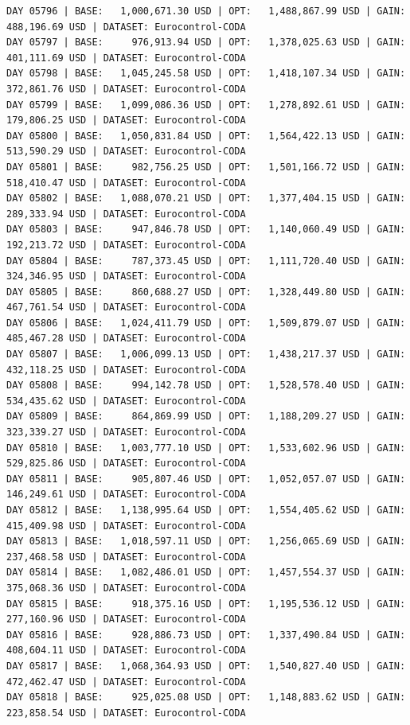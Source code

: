 \documentclass[11pt,a4paper]{article}
\begin{document}
\begin{verbatim}
DAY 05796 | BASE:   1,000,671.30 USD | OPT:   1,488,867.99 USD | GAIN: 488,196.69 USD | DATASET: Eurocontrol-CODA
DAY 05797 | BASE:     976,913.94 USD | OPT:   1,378,025.63 USD | GAIN: 401,111.69 USD | DATASET: Eurocontrol-CODA
DAY 05798 | BASE:   1,045,245.58 USD | OPT:   1,418,107.34 USD | GAIN: 372,861.76 USD | DATASET: Eurocontrol-CODA
DAY 05799 | BASE:   1,099,086.36 USD | OPT:   1,278,892.61 USD | GAIN: 179,806.25 USD | DATASET: Eurocontrol-CODA
DAY 05800 | BASE:   1,050,831.84 USD | OPT:   1,564,422.13 USD | GAIN: 513,590.29 USD | DATASET: Eurocontrol-CODA
DAY 05801 | BASE:     982,756.25 USD | OPT:   1,501,166.72 USD | GAIN: 518,410.47 USD | DATASET: Eurocontrol-CODA
DAY 05802 | BASE:   1,088,070.21 USD | OPT:   1,377,404.15 USD | GAIN: 289,333.94 USD | DATASET: Eurocontrol-CODA
DAY 05803 | BASE:     947,846.78 USD | OPT:   1,140,060.49 USD | GAIN: 192,213.72 USD | DATASET: Eurocontrol-CODA
DAY 05804 | BASE:     787,373.45 USD | OPT:   1,111,720.40 USD | GAIN: 324,346.95 USD | DATASET: Eurocontrol-CODA
DAY 05805 | BASE:     860,688.27 USD | OPT:   1,328,449.80 USD | GAIN: 467,761.54 USD | DATASET: Eurocontrol-CODA
DAY 05806 | BASE:   1,024,411.79 USD | OPT:   1,509,879.07 USD | GAIN: 485,467.28 USD | DATASET: Eurocontrol-CODA
DAY 05807 | BASE:   1,006,099.13 USD | OPT:   1,438,217.37 USD | GAIN: 432,118.25 USD | DATASET: Eurocontrol-CODA
DAY 05808 | BASE:     994,142.78 USD | OPT:   1,528,578.40 USD | GAIN: 534,435.62 USD | DATASET: Eurocontrol-CODA
DAY 05809 | BASE:     864,869.99 USD | OPT:   1,188,209.27 USD | GAIN: 323,339.27 USD | DATASET: Eurocontrol-CODA
DAY 05810 | BASE:   1,003,777.10 USD | OPT:   1,533,602.96 USD | GAIN: 529,825.86 USD | DATASET: Eurocontrol-CODA
DAY 05811 | BASE:     905,807.46 USD | OPT:   1,052,057.07 USD | GAIN: 146,249.61 USD | DATASET: Eurocontrol-CODA
DAY 05812 | BASE:   1,138,995.64 USD | OPT:   1,554,405.62 USD | GAIN: 415,409.98 USD | DATASET: Eurocontrol-CODA
DAY 05813 | BASE:   1,018,597.11 USD | OPT:   1,256,065.69 USD | GAIN: 237,468.58 USD | DATASET: Eurocontrol-CODA
DAY 05814 | BASE:   1,082,486.01 USD | OPT:   1,457,554.37 USD | GAIN: 375,068.36 USD | DATASET: Eurocontrol-CODA
DAY 05815 | BASE:     918,375.16 USD | OPT:   1,195,536.12 USD | GAIN: 277,160.96 USD | DATASET: Eurocontrol-CODA
DAY 05816 | BASE:     928,886.73 USD | OPT:   1,337,490.84 USD | GAIN: 408,604.11 USD | DATASET: Eurocontrol-CODA
DAY 05817 | BASE:   1,068,364.93 USD | OPT:   1,540,827.40 USD | GAIN: 472,462.47 USD | DATASET: Eurocontrol-CODA
DAY 05818 | BASE:     925,025.08 USD | OPT:   1,148,883.62 USD | GAIN: 223,858.54 USD | DATASET: Eurocontrol-CODA

\end{verbatim}
\end{document}
